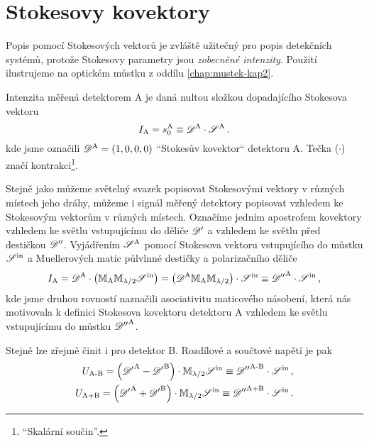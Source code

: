 \section{Stokesovy kovektory}
\label{app:kovektory}


Popis pomocí Stokesových vektorů je zvláště užitečný pro popis detekčních systémů, protože Stokesovy parametry jsou \emph{zobecněné intenzity}.
Použití ilustrujeme na optickém můstku z oddílu \ref{chap:mustek-kap2}.

Intenzita měřená detektorem A je daná nultou složkou dopadajícího Stokesova vektoru
\begin{equation}
    I_\textrm{A}=s_0^\textrm{A} \equiv \mathscr{D}^\textrm{A} \cdot \mathscr{S}^\textrm{A} \,.
\end{equation}
kde jsme označili $\mathscr{D}^\textrm{A}=(1, 0, 0, 0)$ ``Stokesův kovektor`` detektoru A. 
Tečka ($\cdot$) značí kontrakci\footnote{``Skalární součin''.}.

Stejně jako můžeme světelný svazek popisovat Stokesovými vektory v různých místech jeho dráhy, můžeme i signál měřený detektory popisovat vzhledem ke Stokesovým vektorům v různých místech.
Označíme jedním apostrofem kovektory vzhledem ke světlu vstupujícímu do děliče $\mathscr{D}'$ a vzhledem ke světlu před destičkou $\mathscr{D}''$.
Vyjádřením $\mathscr{S}^\textrm{A}$ pomocí Stokesova vektoru vstupujícího do můstku $\mathscr{S}^\textrm{in}$ a Muellerových matic půlvlnné destičky a polarizačního děliče 
\begin{equation}
    I_\textrm{A}= \mathscr{D}^\textrm{A} \cdot \left( \mathbb{M}_\textrm{A} \mathbb{M}_{\lambda/2} \mathscr{S}^\textrm{in} \right) = \left( \mathscr{D}^\textrm{A} \mathbb{M}_\textrm{A} \mathbb{M}_{\lambda/2}\right) \cdot \mathscr{S}^\textrm{in} \equiv {\mathscr{D}''}^\textrm{A} \cdot \mathscr{S}^\textrm{in}  \,,
\end{equation}
kde jsme druhou rovností naznačili asociativitu maticového násobení, která nás motivovala k definici Stokesova kovektoru detektoru A vzhledem ke světlu vstupujícímu do můstku ${\mathscr{D}''}^\textrm{A}$.

Stejně lze zřejmě činit i pro detektor B.
Rozdílové a součtové napětí je pak
\begin{align}
\label{eqn:af}
U_\textrm{A-B} = \left( {\mathscr{D}'}^\textrm{A}-{\mathscr{D}'}^\textrm{B}\right) \cdot \mathbb{M}_{\lambda/2} \mathscr{S}^\textrm{in} \equiv {\mathscr{D}''}^\textrm{A-B}\cdot \mathscr{S}^\textrm{in} \,, \\
U_\textrm{A+B} = \left({\mathscr{D}'}^\textrm{A}+{\mathscr{D}'}^\textrm{B}\right) \cdot \mathbb{M}_{\lambda/2}\mathscr{S}^\textrm{in} \equiv {\mathscr{D}''}^\textrm{A+B}\cdot \mathscr{S}^\textrm{in} \,.
\end{align}

